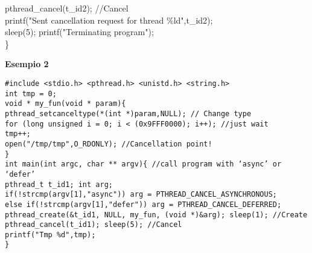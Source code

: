 \begin{flushleft}
\begin{flushleft}
\begin{flushleft}
{      \halftab pthread\_cancel(t\_id2); //Cancel\\
      \halftab printf("Sent cancellation request for thread \%ld\n",t\_id2);\\
      \halftab sleep(5); printf("Terminating program\n");\\
      \}  }
    \end{flushleft}
    \begin{flushleft}
      \textbf{Esempio 2}\\
      \begin{flushleft}
        \texttt{\#include <stdio.h> <pthread.h> <unistd.h> <string.h> \\
        int tmp = 0;\\
        void * my\_fun(void * param)\{ \\ 
        \halftab pthread\_setcanceltype(*(int *)param,NULL); // Change type\\
        \halftab for (long unsigned i = 0; i < (0x9FFF0000); i++); //just wait\\
        \halftab tmp++;\\
        \halftab open("/tmp/tmp",O\_RDONLY); //Cancellation point!\\
        \} \\
        int main(int argc, char ** argv)\{ //call program with ‘async’ or ‘defer’\\
        \halftab pthread\_t t\_id1; int arg;\\
        \halftab if(!strcmp(argv[1],"async")) arg = PTHREAD\_CANCEL\_ASYNCHRONOUS;\\
        \halftab else if(!strcmp(argv[1],"defer")) arg = PTHREAD\_CANCEL\_DEFERRED;\\
        \halftab pthread\_create(\&t\_id1, NULL, my\_fun, (void *)\&arg); sleep(1); //Create\\
        \halftab pthread\_cancel(t\_id1); sleep(5); //Cancel\\
        \halftab printf("Tmp \%d\n",tmp);\\
        \} }
      \end{flushleft}
    \end{flushleft}
  \end{flushleft}

\end{flushleft}
